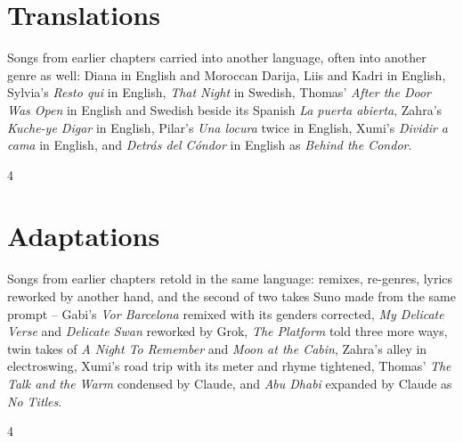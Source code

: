 \documentclass[a4paper,landscape]{memoir}
\begin{document}
\chapter{Translations}
Songs from earlier chapters carried into another language, often into another genre as well: %
Diana in English and Moroccan Darija, Liis and Kadri in English, Sylvia's \emph{Resto qui} in English, %
\emph{That Night} in Swedish, Thomas' \emph{After the Door Was Open} in English and Swedish beside its Spanish \emph{La puerta abierta}, %
Zahra's \emph{Kuche-ye Digar} in English, Pilar's \emph{Una locura} twice in English, %
Xumi's \emph{Dividir a cama} in English, and \emph{Detrás del Cóndor} in English as \emph{Behind the Condor}.
\clearpage\begin{multicols*}{4}













\end{multicols*}

\chapter{Adaptations}
Songs from earlier chapters retold in the same language: remixes, re-genres, lyrics reworked by another hand, %
and the second of two takes Suno made from the same prompt -- Gabi's \emph{Vor Barcelona} remixed with its genders corrected, %
\emph{My Delicate Verse} and \emph{Delicate Swan} reworked by Grok, \emph{The Platform} told three more ways, %
twin takes of \emph{A Night To Remember} and \emph{Moon at the Cabin}, Zahra's alley in electroswing, %
Xumi's road trip with its meter and rhyme tightened, Thomas' \emph{The Talk and the Warm} condensed by Claude, %
and \emph{Abu Dhabi} expanded by Claude as \emph{No Titles}.
\clearpage\begin{multicols*}{4}













\end{multicols*}
\end{document}
